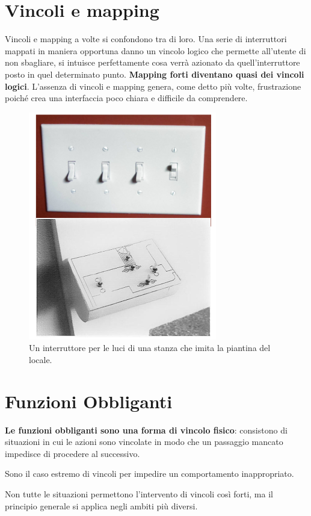 \documentclass[a4paper,11pt,oneside]{book}
\begin{document}
\section{Vincoli e mapping}
Vincoli e mapping a volte si confondono tra di loro. Una serie di interruttori mappati in maniera opportuna danno un vincolo logico che permette all'utente di non sbagliare, si intuisce perfettamente cosa verrà azionato da quell'interruttore posto in quel determinato punto. \textbf{Mapping forti diventano quasi dei vincoli logici}.
L'assenza di vincoli e mapping genera, come detto più volte, frustrazione poiché crea una interfaccia poco chiara e difficile da comprendere.
\begin{figure}[!h]
	\centering
	\includegraphics[scale=0.67]{immagini/Interruttori}
	\caption{Un interruttore per le luci di una stanza che imita la piantina del locale.}
\end{figure}

\pagebreak

\section{Funzioni Obbliganti}
\textbf{Le funzioni obbliganti sono una forma di vincolo fisico}: consistono di situazioni in cui le azioni sono vincolate in modo che un passaggio mancato impedisce di procedere al successivo.

Sono il caso estremo di vincoli per impedire un comportamento inappropriato.

Non tutte le situazioni permettono l'intervento di vincoli così forti, ma il principio generale si applica negli ambiti più diversi.
\end{document}
